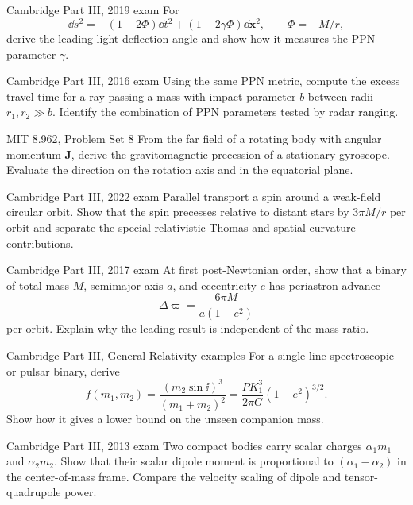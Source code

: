 \begin{exercise}{Cambridge Part III, 2019 exam}
For
\[
\dd s^2=-(1+2\Phi)\dd t^2+(1-2\gamma\Phi)\dd\bm x^2,
\qquad \Phi=-M/r,
\]
derive the leading light-deflection angle and show how it measures the PPN
parameter \(\gamma\).
\end{exercise}

\begin{exercise}{Cambridge Part III, 2016 exam}
Using the same PPN metric, compute the excess travel time for a ray passing a
mass with impact parameter \(b\) between radii \(r_1,r_2\gg b\).  Identify the
combination of PPN parameters tested by radar ranging.
\end{exercise}

\begin{exercise}{MIT 8.962, Problem Set 8}
From the far field of a rotating body with angular momentum \(\bm J\), derive
the gravitomagnetic precession of a stationary gyroscope.  Evaluate the
direction on the rotation axis and in the equatorial plane.
\end{exercise}

\begin{exercise}{Cambridge Part III, 2022 exam}
Parallel transport a spin around a weak-field circular orbit.  Show that the
spin precesses relative to distant stars by \(3\pi M/r\) per orbit and
separate the special-relativistic Thomas and spatial-curvature contributions.
\end{exercise}

\begin{exercise}{Cambridge Part III, 2017 exam}
At first post-Newtonian order, show that a binary of total mass \(M\),
semimajor axis \(a\), and eccentricity \(e\) has periastron advance
\[
\Delta\varpi=\frac{6\pi M}{a(1-e^2)}
\]
per orbit.  Explain why the leading result is independent of the mass ratio.
\end{exercise}

\begin{exercise}{Cambridge Part III, General Relativity examples}
For a single-line spectroscopic or pulsar binary, derive
\[
f(m_1,m_2)=\frac{(m_2\sin \ii)^3}{(m_1+m_2)^2}
=\frac{P K_1^3}{2\pi G}(1-e^2)^{3/2}.
\]
Show how it gives a lower bound on the unseen companion mass.
\end{exercise}

\begin{exercise}{Cambridge Part III, 2013 exam}
Two compact bodies carry scalar charges \(\alpha_1m_1\) and
\(\alpha_2m_2\).  Show that their scalar dipole moment is proportional to
\((\alpha_1-\alpha_2)\) in the center-of-mass frame.  Compare the velocity
scaling of dipole and tensor-quadrupole power.
\end{exercise}

